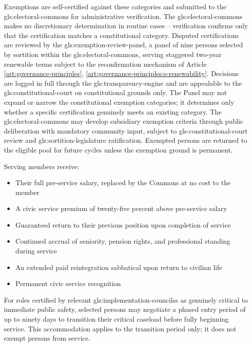 Exemptions are self-certified against these categories and submitted to the \gls{gls:electoral-commons} for administrative verification. The \gls{gls:electoral-commons} makes no discretionary determination in routine cases -- verification confirms only that the certification matches a constitutional category. Disputed certifications are reviewed by the \gls{gls:exemption-review-panel}, a panel of nine persons selected by sortition within the \gls{gls:electoral-commons}, serving staggered two-year renewable terms subject to the reconfirmation mechanism of Article \ref{art:governance-principles}, \ref{art:governance-principles:s-renewability}. Decisions are logged in full through the \gls{gls:transparency-engine} and are appealable to the \gls{gls:constitutional-court} on constitutional grounds only. The Panel may not expand or narrow the constitutional exemption categories; it determines only whether a specific certification genuinely meets an existing category. The \gls{gls:electoral-commons} may develop subsidiary exemption criteria through public deliberation with mandatory community input, subject to \gls{gls:constitutional-court} review and \gls{gls:sortition-legislature} ratification. Exempted persons are returned to the eligible pool for future cycles unless the exemption ground is permanent.

Serving members receive:
\begin{itemize}
  \item Their full pre-service salary, replaced by the Commons at no cost to the member
  \item A civic service premium of twenty-five percent above pre-service salary
  \item Guaranteed return to their previous position upon completion of service
  \item Continued accrual of seniority, pension rights, and professional standing during service
  \item An extended paid reintegration sabbatical upon return to civilian life
  \item Permanent civic service recognition
\end{itemize}

For roles certified by relevant \gls{gls:implementation-councils}s as genuinely critical to immediate public safety, selected persons may negotiate a phased entry period of up to ninety days to transition their critical caseload before fully beginning service. This accommodation applies to the transition period only; it does not exempt persons from service.


